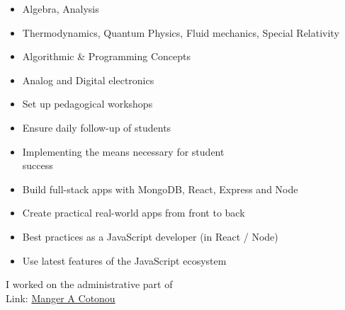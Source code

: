 \documentclass[10pt,a4paper,ragged2e,withhyper]{altacv}
\begin{document}
\begin{paracol}{2}
\divider

\begin{itemize}
\item Algebra, Analysis
\item Thermodynamics, Quantum Physics, Fluid mechanics, Special Relativity
\item Algorithmic \& Programming Concepts
\item Analog and Digital electronics
\end{itemize}

\newpage
\switchcolumn


\begin{itemize}
\item Set up pedagogical workshops
\item Ensure daily follow-up of students
\item Implementing the means necessary for student\\
success
\end{itemize}

\divider

\begin{itemize}
\item Build full-stack apps with MongoDB, React, Express and Node
\item Create practical real-world apps from front to back
\item Best practices as a JavaScript developer (in React / Node)
\item Use latest features of the JavaScript ecosystem
\end{itemize}
I worked on the administrative part of\\
Link:
\href{https://mangeracotonou.com}{Manger A Cotonou}\\

\divider


\end{paracol}
\end{document}
